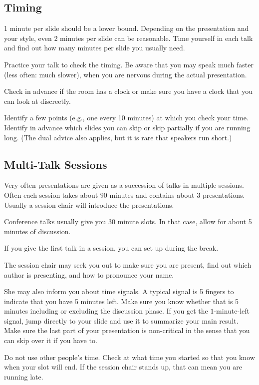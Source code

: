 \documentclass[12pt]{article}
\begin{document}
\subsection{Timing}

1 minute per slide should be a lower bound.
Depending on the presentation and your style, even 2 minutes per slide can be reasonable.
Time yourself in each talk and find out how many minutes per slide you usually need.
\medskip

Practice your talk to check the timing.
Be aware that you may speak much faster (less often: much slower), when you are nervous during the actual presentation.
\medskip

Check in advance if the room has a clock or make sure you have a clock that you can look at discreetly.
\medskip

Identify a few points (e.g., one every 10 minutes) at which you check your time.
Identify in advance which slides you can skip or skip partially if you are running long.
(The dual advice also applies, but it is rare that speakers run short.)

\subsection{Multi-Talk Sessions}

Very often presentations are given as a succession of talks in multiple sessions.
Often each session takes about $90$ minutes and contains about $3$ presentations.
Usually a session chair will introduce the presentations.
\medskip

Conference talks usually give you 30 minute slots.
In that case, allow for about 5 minutes of discussion.
\medskip

If you give the first talk in a session, you can set up during the break.
\medskip

The session chair may seek you out to make sure you are present, find out which author is presenting, and how to pronounce your name.

She may also inform you about time signals.
A typical signal is 5 fingers to indicate that you have 5 minutes left.
Make sure you know whether that is 5 minutes including or excluding the discussion phase.
If you get the $1$-minute-left signal, jump directly to your slide and use it to summarize your main result.
Make sure the last part of your presentation is non-critical in the sense that you can skip over it if you have to.
\medskip

Do not use other people's time.
Check at what time you started so that you know when your slot will end.
If the session chair stands up, that can mean you are running late.
\end{document}
